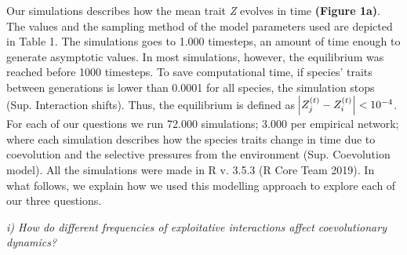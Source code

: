 \documentclass[a4paper, 12pt]{article}
\begin{document}
Our simulations describes how the mean trait \textit{Z} evolves in time \textbf{(Figure 1a)}. The values and the sampling method of the model parameters used are depicted in Table 1. The simulations goes to 1.000 timesteps, an amount of time enough to generate asymptotic values. In most simulations, however, the equilibrium was reached before 1000 timesteps. To save computational time, if species’ traits between generations is lower than 0.0001 for all species, the simulation stops (Sup. Interaction shifts). Thus, the equilibrium is defined as $\abs{Z^{(t)}_{j} - Z^{(t)}_{i}} < 10^{-4}$. For each of our questions we run 72.000 simulations; 3.000 per empirical network; where each simulation describes how the species traits change in time due to coevolution and the selective pressures from the environment (Sup. Coevolution model). All the simulations were made in R v. 3.5.3 (R Core Team 2019). In what follows, we explain how we used this modelling approach to explore each of our three questions.

\textit{i) How do different frequencies of exploitative interactions affect  coevolutionary dynamics?}
\end{document}
